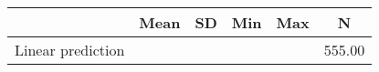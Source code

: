 {
\def\sym#1{\ifmmode^{#1}\else\(^{#1}\)\fi}
\begin{tabular}{l*{1}{ccccc}}
\hline\hline
                    &        Mean&          SD&         Min&         Max&           N\\
\hline
Linear prediction   &            &            &            &            &      555.00\\
\hline\hline
\end{tabular}
}
